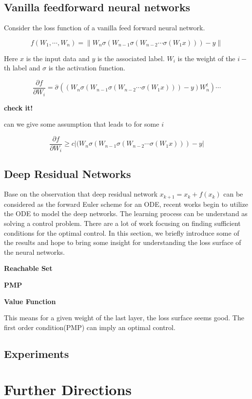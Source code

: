 \documentclass{article}
\theoremstyle{plain}
\theoremstyle{definition}
\begin{document}
\subsection{Vanilla feedforward neural networks}
Consider the loss function of a vanilla feed forward neural network.

$$f(W_1,\cdots,W_n)=\left\|W_n\sigma (W_{n-1}\sigma(W_{n-2}\cdots\sigma(W_1x)))-y\right\|$$

Here $x$ is the input data and $y$ is the associated label. $W_i$ is the weight of the $i-$th label and $\sigma$ is the activation function.


$$
\frac{\partial f}{\partial W_i}=\hat\sigma((W_n\sigma (W_{n-1}\sigma(W_{n-2}\cdots\sigma(W_1x)))-y)W_n^t)\cdots
$$

\textbf{check it!} 

can we give some assumption that leads to for some $i$

$$
\frac{\partial f}{\partial W_i} \ge c|(W_n\sigma (W_{n-1}\sigma(W_{n-2}\cdots\sigma(W_1x)))-y|
$$

\subsection{Deep Residual Networks}

Base on the observation that deep residual network $x_{k+1}=x_{k}+f(x_k)$ can be considered as the forward Euler scheme for an ODE, recent works begin to utilize the ODE to model the deep networks. The learning process can be understand as solving a control problem. There are a lot of work focusing on finding sufficient conditions for the optimal control. In this section, we briefly introduce some of the results and hope to bring some insight for understanding the loss surface of the neural networks.

\textbf{Reachable Set}

\textbf{PMP}

\textbf{Value Function}

This means for a given weight of the last layer, the loss surface seems good. The first order condition(PMP) can imply an optimal control. 

\subsection{Experiments}

\section{Further Directions}
\end{document}
